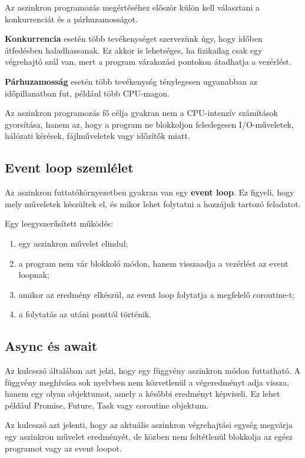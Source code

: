 Az aszinkron programozás megértéséhez először külön kell választani a konkurrenciát és a párhuzamosságot.

\textbf{Konkurrencia} esetén több tevékenységet szervezünk úgy, hogy időben átfedésben haladhassanak. Ez akkor is lehetséges, ha fizikailag csak egy végrehajtó szál van, mert a program várakozási pontokon átadhatja a vezérlést.

\textbf{Párhuzamosság} esetén több tevékenység ténylegesen ugyanabban az időpillanatban fut, például több CPU-magon.

Az aszinkron programozás fő célja gyakran nem a CPU-intenzív számítások gyorsítása, hanem az, hogy a program ne blokkoljon feleslegesen I/O-műveletek, hálózati kérések, fájlműveletek vagy időzítők miatt.

\subsection{Event loop szemlélet}

Az aszinkron futtatókörnyezetben gyakran van egy \textbf{event loop}. Ez figyeli, hogy mely műveletek készültek el, és mikor lehet folytatni a hozzájuk tartozó feladatot.

Egy leegyszerűsített működés:

\begin{enumerate}
  \item egy aszinkron művelet elindul;
  \item a program nem vár blokkoló módon, hanem visszaadja a vezérlést az event loopnak;
  \item amikor az eredmény elkészül, az event loop folytatja a megfelelő coroutine-t;
  \item a folytatás az  utáni ponttól történik.
\end{enumerate}

\subsection{Async és await}

Az  kulcsszó általában azt jelzi, hogy egy függvény aszinkron módon futtatható. A függvény meghívása sok nyelvben nem közvetlenül a végeredményt adja vissza, hanem egy olyan objektumot, amely a későbbi eredményt képviseli. Ez lehet például Promise, Future, Task vagy coroutine objektum.

Az  kulcsszó azt jelenti, hogy az aktuális aszinkron végrehajtási egység megvárja egy aszinkron művelet eredményét, de közben nem feltétlenül blokkolja az egész programot vagy az event loopot.

